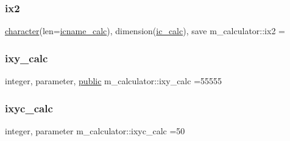 \mbox{\label{namespacem__calculator_a1d671e939e22b8530ef0cd575bf7dd04}} 
\subsubsection{\texorpdfstring{ix2}{ix2}}
{\footnotesize\ttfamily \hyperlink{option__stopwatch_83_8txt_abd4b21fbbd175834027b5224bfe97e66}{character}(len=\hyperlink{namespacem__calculator_a482f8880712dc8f52ef6833de3243875}{icname\+\_\+calc}), dimension(\hyperlink{namespacem__calculator_a462e5bf8d038196149ba96c22a614284}{ic\+\_\+calc}), save m\+\_\+calculator\+::ix2 =\textquotesingle{} \textquotesingle{}\hspace{0.3cm}{\ttfamily [private]}}

\mbox{\label{namespacem__calculator_addb6e867e526d278a9901ef8e7ff8bb6}} 
\subsubsection{\texorpdfstring{ixy\+\_\+calc}{ixy\_calc}}
{\footnotesize\ttfamily integer, parameter, \hyperlink{M__stopwatch_83_8txt_a2f74811300c361e53b430611a7d1769f}{public} m\+\_\+calculator\+::ixy\+\_\+calc =55555}

\mbox{\label{namespacem__calculator_a7f11fbca3121837187391693c8bf3f01}} 
\subsubsection{\texorpdfstring{ixyc\+\_\+calc}{ixyc\_calc}}
{\footnotesize\ttfamily integer, parameter m\+\_\+calculator\+::ixyc\+\_\+calc =50\hspace{0.3cm}{\ttfamily [private]}}

\mbox{\label{namespacem__calculator_ada86fed286e7bff1456862ab8b5bde47}} 
